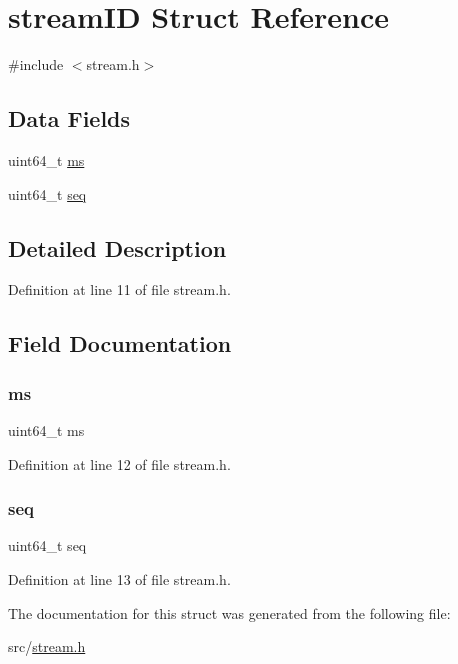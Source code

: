 \hypertarget{structstream_i_d}{}\section{stream\+ID Struct Reference}
\label{structstream_i_d}


{\ttfamily \#include $<$stream.\+h$>$}

\subsection*{Data Fields}
\begin{DoxyCompactItemize}
\item 
uint64\+\_\+t \hyperlink{structstream_i_d_a1bf4f73eb584af5363a7bb561e81eb45}{ms}
\item 
uint64\+\_\+t \hyperlink{structstream_i_d_a35f8a83e7dd43093242d8cbb38ddbb5a}{seq}
\end{DoxyCompactItemize}


\subsection{Detailed Description}


Definition at line 11 of file stream.\+h.



\subsection{Field Documentation}
\mbox{\label{structstream_i_d_a1bf4f73eb584af5363a7bb561e81eb45}} 
\subsubsection{\texorpdfstring{ms}{ms}}
{\footnotesize\ttfamily uint64\+\_\+t ms}



Definition at line 12 of file stream.\+h.

\mbox{\label{structstream_i_d_a35f8a83e7dd43093242d8cbb38ddbb5a}} 
\subsubsection{\texorpdfstring{seq}{seq}}
{\footnotesize\ttfamily uint64\+\_\+t seq}



Definition at line 13 of file stream.\+h.



The documentation for this struct was generated from the following file\+:\begin{DoxyCompactItemize}
\item 
src/\hyperlink{stream_8h}{stream.\+h}\end{DoxyCompactItemize}

